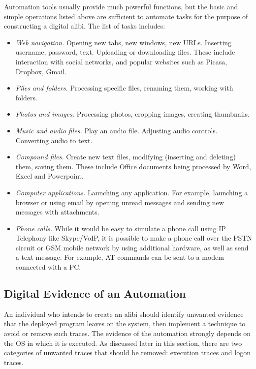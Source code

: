 \documentclass[runningheads]{llncs}
\begin{document}
Automation tools usually provide much powerful functions, but the basic and simple operations listed 
above are sufficient to automate tasks for the purpose of constructing a digital alibi.
The list of tasks includes:
\begin{itemize}
\item {\em Web navigation.} Opening new tabs, new windows, new URLs. Inserting
username, password, text. Uploading or downloading files. These include
interaction with social networks, and popular websites such as Picasa, Dropbox,
Gmail.
\item {\em Files and folders.} Processing specific files, renaming them, working
with folders.
\item {\em Photos and images.} Processing photos, cropping images, creating
thumbnails.
\item {\em Music and audio files.} Play an audio file. Adjusting audio controls.
Converting audio to text.
\item {\em Compound files.} Create new text files, modifying (inserting and
deleting) them, saving them. These include Office documents being processed by Word, Excel and Powerpoint.
\item {\em Computer applications.} Launching any application. For example,
launching a browser or using email by opening unread messages and sending new messages with attachments.
\item {\em Phone calls.} While it would be easy to simulate a phone call using
IP Telephony like Skype/VoIP, it is possible to make a phone call over the PSTN
circuit or GSM mobile network by using additional hardware, as well as send a text message. For example, AT commands can be sent to a modem connected with a PC.
\end{itemize}


\subsection{Digital Evidence of an Automation}
\label{sub:automevid}

An individual who intends to create an alibi should identify unwanted evidence that the deployed program leaves on the system, then implement a technique to avoid or remove such traces.
The evidence of the automation strongly depends on the OS in which it is executed. As discussed later in this section, there are two categories of unwanted traces that should be removed: execution traces and logon traces.
\end{document}
